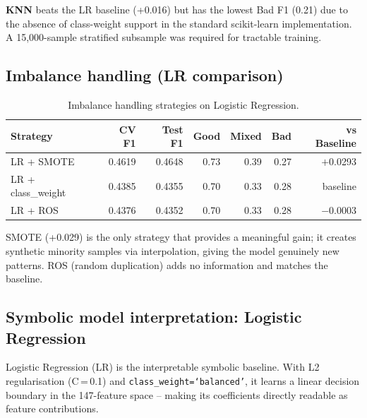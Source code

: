 \documentclass[11pt, a4paper]{article}
\begin{document}
\textbf{KNN} beats the LR baseline (+0.016) but has the lowest Bad F1 (0.21) due to
the absence of class-weight support in the standard scikit-learn implementation.
A 15,000-sample stratified subsample was required for tractable training.

\subsection{Imbalance handling (LR comparison)}

\begin{table}[H]
  \centering\small
  \caption{Imbalance handling strategies on Logistic Regression.}
  \label{tab:imbalance}
  \begin{tabular}{lrrrrrr}
    \toprule
    \textbf{Strategy} & \textbf{CV F1} & \textbf{Test F1} &
    \textbf{Good} & \textbf{Mixed} & \textbf{Bad} & \textbf{vs Baseline} \\
    \midrule
    LR + SMOTE           & 0.4619 & 0.4648 & 0.73 & 0.39 & 0.27 & $+$0.0293 \\
    LR + class\_weight   & 0.4385 & 0.4355 & 0.70 & 0.33 & 0.28 & baseline  \\
    LR + ROS             & 0.4376 & 0.4352 & 0.70 & 0.33 & 0.28 & $-$0.0003 \\
    \bottomrule
  \end{tabular}
\end{table}

SMOTE (+0.029) is the only strategy that provides a meaningful gain; it creates
synthetic minority samples via interpolation, giving the model genuinely new patterns.
ROS (random duplication) adds no information and matches the baseline.

\subsection{Symbolic model interpretation: Logistic Regression}
\label{sec:lr_interp}

Logistic Regression (LR) is the interpretable symbolic baseline.
With L2 regularisation (C\,=\,0.1) and \texttt{class\_weight=`balanced'}, it learns a
linear decision boundary in the 147-feature space -- making its coefficients directly
readable as feature contributions.
\end{document}
